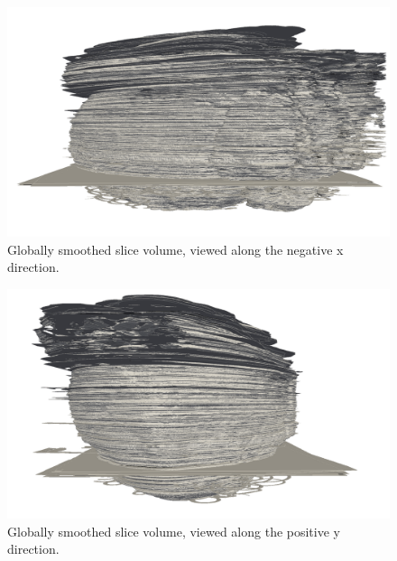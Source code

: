   \begin{figure}
    \centering
    \includegraphics[width=0.9\textheight]{Ch6/Figs/Rat28/contours/whole_negative_x_diffused}
    \caption{Globally smoothed slice volume, viewed along the negative x direction.}
    \label{fig:whole_negative_x_diffused}
  \end{figure}

  \begin{figure}
    \centering
    \includegraphics[width=0.9\textheight]{Ch6/Figs/Rat28/contours/whole_positive_y_diffused}
    \caption{Globally smoothed slice volume, viewed along the positive y direction.}
    \label{fig:whole_positive_y_diffused}
  \end{figure}
  
